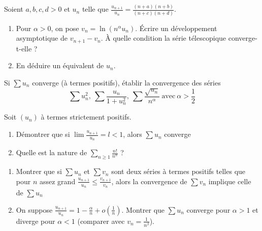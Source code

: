 \begin{exercice}
    Soient $a, b, c, d > 0$ et $u_{n}$ telle que $\frac{u_{n+1}}{u_{n}}=\frac{(n+a)(n+b)}{(n+c)(n+d)}$.
    \begin{enumerate}
        \item Pour $\alpha>0$, on pose $v_{n}=\ln(n^{\alpha}u_{n})$. Écrire un développement asymptotique de $v_{n+1}-v_{n}$. 
            À quelle condition la série télescopique converge-t-elle ?
        \item En déduire un équivalent de $u_{n}$.
    \end{enumerate}
\end{exercice}

\begin{exercice}
    Si $\sum u_{n}$ converge (à termes positifs), établir la convergence des séries
    \[\sum u_{n}^{2},~ \sum\frac{u_{n}}{1+u_{n}^{2}}, ~\sum\frac{\sqrt{u_{n}}}{n^{\alpha}} ~\text{avec}~ \alpha>\frac{1}{2}\]
\end{exercice}

\begin{exercice}
    Soit $(u_{n})$ à termes strictement positifs.
    \begin{enumerate}
        \item Démontrer que si $\lim \frac{u_{n+1}}{u_{n}}=l < 1$, alors $\sum u_{n}$ converge
        \item Quelle est la nature de $\sum_{n\geqslant1}\frac{n!}{n^{n}}$ ?
    \end{enumerate}
\end{exercice}

\begin{exercice}
\begin{enumerate}
    \item Montrer que si $\sum u_{n}$ et $\sum v_{n}$ sont deux séries à termes positifs 
        telles que pour $n$ assez grand $\frac{u_{n+1}}{u_{n}}\leqslant\frac{v_{n+1}}{v_{n}}$, 
        alors la convergence de $\sum v_{n}$ implique celle de $\sum u_{n}$
    \item On suppose $\frac{u_{n+1}}{u_{n}}=1-\frac{\alpha}{n}+o\left(\frac{1}{n}\right)$. 
        Montrer que $\sum u_{n}$ converge pour $\alpha>1$ et diverge pour $\alpha<1$ (comparer avec $v_n = \frac{1}{n^\beta}$).
\end{enumerate}
\end{exercice}

